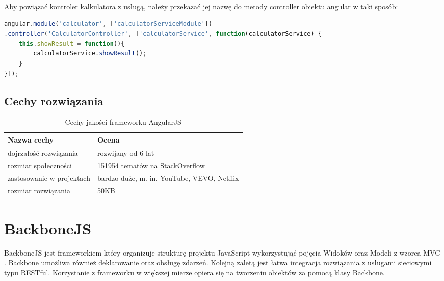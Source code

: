 Aby powiązać kontroler kalkulatora z usługą, należy przekazać jej nazwę do metody controller obiektu angular w taki sposób:
\begin{lstlisting}[language=JavaScript]
angular.module('calculator', ['calculatorServiceModule'])
.controller('CalculatorController', ['calculatorService', function(calculatorService) {
	this.showResult = function(){
		calculatorService.showResult();
	}
}]);
\end{lstlisting}

\subsection{Cechy rozwiązania}
\begin{table}[h]
	\caption{Cechy jakości frameworku AngularJS}
	\label{tab:heading-styles}
	\begin{tabularx}{\textwidth}{|X|X|}
		\hline
		Nazwa cechy							& Ocena 	\\ 
		\hline
		dojrzałość rozwiązania 				& rozwijany od 6 lat 	\\ 
		\hline
		rozmiar społeczności				& 151954 tematów na StackOverflow \\ 
		\hline
		zastosowanie w projektach			& bardzo duże, m. in. YouTube, VEVO, Netflix \\ 
		\hline
		rozmiar rozwiązania					& 50KB  \\
		\hline
	\end{tabularx}
\end{table}


\section{BackboneJS}
BackboneJS jest frameworkiem który organizuje strukturę projektu JavaScript wykorzystująć pojęcia Widoków oraz Modeli z wzorca MVC \cite{backbonejs}. Backbone umożliwa również deklarowanie oraz obsługę zdarzeń. Kolejną zaletą jest łatwa integracja rozwiązania z usługami sieciowymi typu RESTful. Korzystanie z frameworku w większej mierze opiera się na tworzeniu obiektów za pomocą klasy Backbone.

